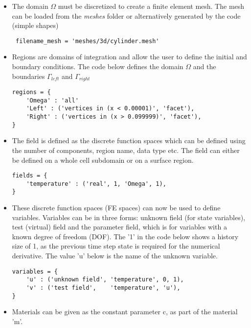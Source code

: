 \documentclass{article}
\begin{document}
\begin{itemize}

\item The domain $\Omega$ must be discretized to create a finite element mesh. The mesh can be loaded from the \emph{meshes} folder or alternatively generated by the code (simple shapes)

\lstset{language=Python}
\begin{lstlisting}
 filename_mesh = 'meshes/3d/cylinder.mesh'
\end{lstlisting}

\item Regions are domains of integration and allow the user to define the initial and boundary conditions. The code below defines the domain $\Omega$ and the boundaries $\Gamma_{left}$ and $\Gamma_{right}$

\begin{lstlisting}
regions = {
	'Omega' : 'all'
	'Left' : ('vertices in (x < 0.00001)', 'facet'),
	'Right' : ('vertices in (x > 0.099999)', 'facet'),
}
\end{lstlisting}

\item The field is defined as the discrete function spaces which can be defined using the number of components, region name, data type etc. The field can either be defined on a whole cell subdomain or on a surface region.

\begin{lstlisting}
fields = {
	'temperature' : ('real', 1, 'Omega', 1),
}
\end{lstlisting}

\item These discrete function spaces (FE spaces) can now be used to define variables. Variables can be in three forms: unknown field (for state variables), test (virtual) field and the parameter field, which is for variables with a known degree of freedom (DOF). The '1' in the code below shows a history size of 1, as the previous time step state is required for the numerical derivative. The value 'u' below is the name of the unknown variable.

\begin{lstlisting}
variables = {
	'u' : ('unknown field', 'temperature', 0, 1),
	'v' : ('test field',    'temperature', 'u'),
}
\end{lstlisting}

\item Materials can be given as the constant parameter c, as part of the material 'm'.


\end{itemize}
\end{document}
